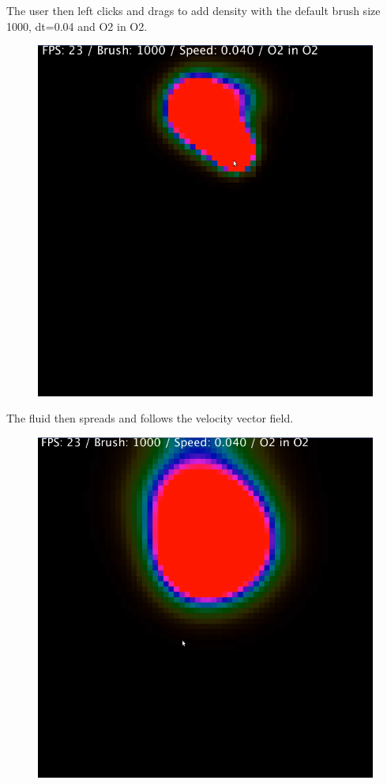 \documentclass[12pt,a4paper]{book}
\begin{document}
\pagebreak
The user then left clicks and drags to add density with the default brush size 1000, dt=0.04 and O2 in O2.

\begin{figure}[H]
	\includegraphics[scale=0.5]{pics/1.png}
\end{figure}

\pagebreak
The fluid then spreads and follows the velocity vector field.

\begin{figure}[H]
	\includegraphics[scale=0.5]{pics/2.png}
\end{figure}
\end{document}
